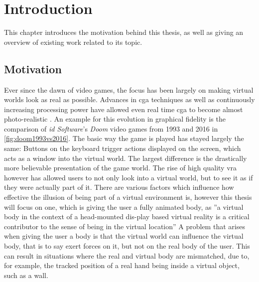 
\chapter{Introduction}\label{chapter:Introduction}

This chapter introduces the motivation behind this thesis, as well as giving an overview of existing work related to its topic.


\section{Motivation}

Ever since the dawn of video games, the focus has been largely on making virtual worlds look as real as possible. Advances in \gls{cga} techniques as well as continuously increasing processing power have allowed even real time \gls{cga} to become almost photo-realistic \autocite{photorealismRealtime}.
\newline
An example for this evolution in graphical fidelity is the comparison of \textit{id Software}'s \textit{Doom} video games from 1993 and 2016 in \autoref{fig:doom1993vs2016}. The basic way the game is played has stayed largely the same: Buttons on the keyboard trigger actions displayed on the screen, which acts as a window into the virtual world. The largest difference is the drastically more believable presentation of the game world.
\newline
The rise of high quality \gls{vra} however has allowed users to not only look into a virtual world, but to see it as if they were actually part of it. There are various factors which influence how effective the illusion of being part of a virtual environment is, however this thesis will focus on one, which is giving the user a fully animated body, as ''a virtual body in the context of a head-mounted dis-play based virtual reality is a critical contributor to the sense of being in the virtual location'' \autocite[p.~374]{senseEmbodimentVR}
\newline
A problem that arises when giving the user a body is that the virtual world can influence the virtual body, that is to say exert forces on it, but not on the real body of the user. This can result in situations where the real and virtual body are mismatched, due to, for example, the tracked position of a real hand being inside a virtual object, such as a wall.



